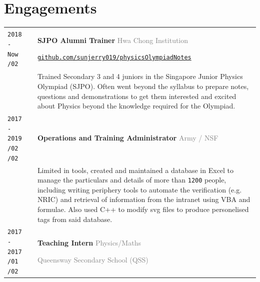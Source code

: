 \documentclass[11pt]{article}
\newcommand{\monoSp}[1]{{\usefont{T1}{rbtm}{m}{n} #1}}
\newcommand{\urllinkout}[2]{\href{#1}{\textcolor{text_link}{\small \texttt{#2}}}}
\newcommand{\code}[1]{\colorbox{code_back}{\monoSp{#1}}}
\newcommand{\nummer}[1]{\texttt{\large #1}}
\begin{document}
\section{\textcolor{section_3}{Engagements}}
\vspace{-\baselineskip}
{
	\renewcommand{\arraystretch}{2}
	\renewcommand{\cellalign}{lt}
	\begin{tabularx}{\textwidth}{@{}l p{0.20cm} X @{}}
		\makecell{\texttt{\large 2018 - Now} \vspace{-1mm} \\ \texttt{\footnotesize /02}} & & \textbf{SJPO Alumni Trainer} \hfill \textcolor{gray}{Hwa Chong Institution} \par \urllinkout{http://github.com/sunjerry019/physicsOlympiadNotes}{github.com/sunjerry019/physicsOlympiadNotes} \\[-0.5em]
		& & Trained Secondary 3 and 4 juniors in the Singapore Junior Physics Olympiad {\footnotesize (SJPO)}. Often went beyond the syllabus to prepare notes, questions and demonstrations to get them interested and excited about Physics beyond the knowledge required for the Olympiad. \\
		\makecell{\texttt{\large 2017 - 2019} \vspace{-1mm} \\ \texttt{\footnotesize /02} \hspace{1.5em} \texttt{\footnotesize /02}} & & \textbf{Operations and Training Administrator} \hfill \textcolor{gray}{Army / NSF} \\[-0.5em]
		& & Limited in tools, created and maintained a database in Excel to manage the particulars and details of more than \nummer{1200} people, including writing periphery tools to automate the verification {\footnotesize(e.g. NRIC)} and retrieval of information from the intranet using \code{VBA} and formulae. Also used \code{C++} to modify \code{svg} files to produce personelised tags from said database.\\
		\makecell{\texttt{\large 2017 - 2017} \vspace{-1mm} \\ \texttt{\footnotesize /01} \hspace{1.5em} \texttt{\footnotesize /02}} & & \textbf{Teaching Intern} \hfill \textcolor{gray}{Physics/Maths} \par \textcolor{gray}{Queensway Secondary School {\footnotesize (QSS)}}\\[-0.5em]

\end{tabularx}}
\end{document}
